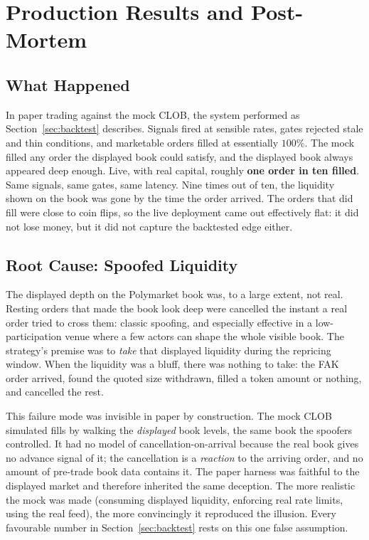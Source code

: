 \documentclass{tmsce}
\let\oldsection\section
\renewcommand{\section}{\clearpage\oldsection}
\begin{document}
\section{Production Results and Post-Mortem}
\label{sec:postmortem}

\subsection{What Happened}

In paper trading against the mock CLOB, the system performed as
Section~\ref{sec:backtest} describes. Signals fired at sensible rates, gates rejected
stale and thin conditions, and marketable orders filled at essentially $100\%$. The
mock filled any order the displayed book could satisfy, and the displayed book always
appeared deep enough. Live, with real capital, roughly \textbf{one order in ten
filled}. Same signals, same gates, same latency. Nine times out of ten, the liquidity
shown on the book was gone by the time the order arrived. The orders that did fill
were close to coin flips, so the live deployment came out effectively flat: it did not
lose money, but it did not capture the backtested edge either.

\subsection{Root Cause: Spoofed Liquidity}

The displayed depth on the Polymarket book was, to a large extent, not real. Resting
orders that made the book look deep were cancelled the instant a real order tried to
cross them: classic spoofing, and especially effective in a low-participation venue
where a few actors can shape the whole visible book. The strategy's premise was to
\emph{take} that displayed liquidity during the repricing window. When the liquidity
was a bluff, there was nothing to take: the FAK order arrived, found the quoted size
withdrawn, filled a token amount or nothing, and cancelled the rest.

\medskip
\noindent This failure mode was invisible in paper by construction. The mock CLOB
simulated fills by walking the \emph{displayed} book levels, the same book the
spoofers controlled. It had no model of cancellation-on-arrival because the real book
gives no advance signal of it; the cancellation is a \emph{reaction} to the arriving
order, and no amount of pre-trade book data contains it. The paper harness was
faithful to the displayed market and therefore inherited the same deception. The more
realistic the mock was made (consuming displayed liquidity, enforcing real rate
limits, using the real feed), the more convincingly it reproduced the illusion. Every
favourable number in Section~\ref{sec:backtest} rests on this one false assumption.
\end{document}
